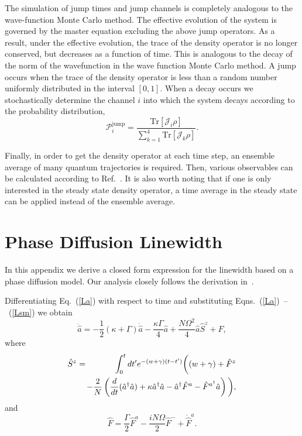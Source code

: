 \documentclass[aps,
twocolumn,
showpacs,
superscriptaddress,groupedaddress]{revtex4}
\begin{document}
The simulation of jump times and jump channels is completely analogous
to the wave-function Monte Carlo method. The effective evolution of the
system is governed by the master equation excluding the above jump
operators. As a result, under the effective evolution, the trace of the
density operator is no longer conserved, but decreases as a function of
time.  This is analogous to the decay of the norm of the wavefunction in
the wave function Monte Carlo method. A jump occurs when the trace of
the density operator is less than a random number uniformly distributed
in the interval $[0,1]$. When a decay occurs we stochastically determine
the channel $i$ into which the system decays according to the
probability distribution,
\begin{equation}
\mathcal{P}_i^{\mathrm{jump}}=\frac{\mathrm{Tr}[\mathcal{J}_i\rho]}{\sum_{k=1}^4
\mathrm{Tr}[\mathcal{J}_k\rho]}.
\end{equation}

Finally, in order to get the density operator at each time step, an
ensemble average of many quantum trajectories is required. Then, various
observables can be calculated according to Ref.~\cite{PhysRevA.87.062101}. It is
also worth noting that if one is only interested in the steady state
density operator, a time average in the steady state can be applied
instead of the ensemble average.


\section{Phase Diffusion Linewidth}
\label{HakenAppendix}

In this appendix we derive a closed form expression for the linewidth
based on a phase diffusion model.  Our analysis closely follows the
derivation in~\cite{HakenLaser, HakenLaserBook}.

Differentiating Eq.~(\ref{La}) with respect to time and substituting 
Eqns.~(\ref{La})~--~(\ref{Lsm}) we obtain
\begin{equation}
\ddot{\hat{a}} =
-\frac{1}{2} (\kappa+\Gamma)  \dot{\hat{a}} -
\frac{\kappa \Gamma}{4}\hat{a}  +
\frac{N \Omega^2 }{4} \hat{a} \hat{S}^z +\hat{F},
\label{addeq}
\end{equation}
where
\begin{eqnarray}
\hat{S}^z &=&
\int_0^t dt^{\prime} e^{-(w+\gamma)(t-t^{\prime})}
\bigg( (w+\gamma) + \hat{F}^z
\nonumber
\\
&&\hspace{-3mm}-\frac{2}{N} \left( \frac{d}{dt} (\hat{a}^{\dagger} \hat{a}) +
\kappa \hat{a}^{\dagger} \hat{a} -\hat{a}^{\dagger} \hat{F}^a -
\hat{F}^{a^{\dagger}} \hat{a} \right) \bigg),
\end{eqnarray}
and
\begin{equation}
\hat{F} = \frac{\Gamma}{2} \hat{F}^a-
\frac{i N \Omega}{2} \hat{F}^-+\dot{\hat{F}}^a.
\end{equation}
\end{document}
